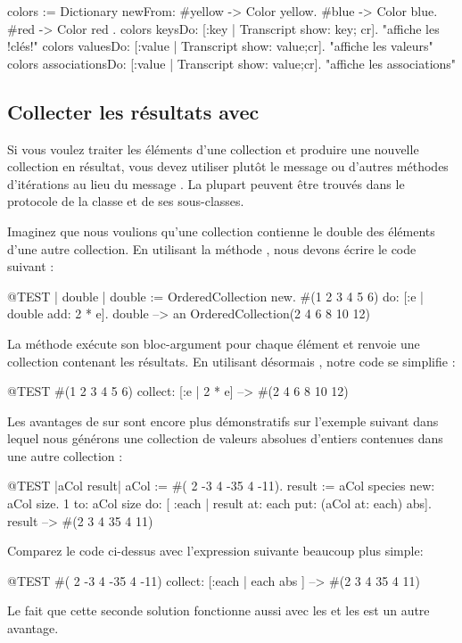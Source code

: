 \documentclass[a4paper,10pt,twoside]{book}
\begin{document}
\begin{code}{}
colors := Dictionary newFrom: { #yellow -> Color yellow. #blue -> Color blue. #red -> Color red }.
colors keysDo: [:key | Transcript show: key; cr].                    "affiche les !clés!"
colors valuesDo: [:value | Transcript show: value;cr].            "affiche les valeurs"
colors associationsDo: [:value | Transcript show: value;cr].  "affiche les associations"
\end{code}

\subsection{Collecter les résultats avec }
Si vous voulez traiter les éléments d'une collection et produire
une nouvelle collection en résultat, vous devez utiliser plutôt le
message  ou d'autres méthodes d'itérations au lieu
du message .
La plupart peuvent être trouvés dans le protocole  
de la classe  et de ses sous-classes.

Imaginez que nous voulions qu'une collection contienne le double des éléments d'une autre collection. 
En utilisant la méthode , nous devons écrire le code suivant :

\begin{code}{@TEST | double |}
double := OrderedCollection new.
#(1 2 3 4 5 6) do: [:e | double add: 2 * e].
double --> an OrderedCollection(2 4 6 8 10 12)
\end{code}

\noindent
La méthode  exécute son bloc-argument
pour chaque élément et renvoie une collection contenant les résultats.
En utilisant désormais , notre code se simplifie :
\begin{code}{@TEST}
#(1 2 3 4 5 6) collect: [:e | 2 * e] --> #(2 4 6 8 10 12)
\end{code}

Les avantages de  sur  sont encore
plus démonstratifs sur l'exemple suivant dans lequel nous générons
une collection de valeurs absolues d'entiers contenues dans une autre
collection :

\begin{code}{@TEST |aCol result|}
aCol :=  #( 2 -3 4 -35 4 -11).
result := aCol species new: aCol size.
1 to: aCol size do: [ :each | result at: each put: (aCol at: each) abs].
result --> #(2 3 4 35 4 11)
\end{code}
\noindent
Comparez le code ci-dessus avec l'expression suivante beaucoup plus simple:
\begin{code}{@TEST}
#( 2 -3 4 -35 4 -11) collect: [:each | each abs ] --> #(2 3 4 35 4 11)
\end{code}
\noindent
Le fait que cette seconde solution fonctionne aussi avec les  et les  est un autre avantage.
\end{document}
